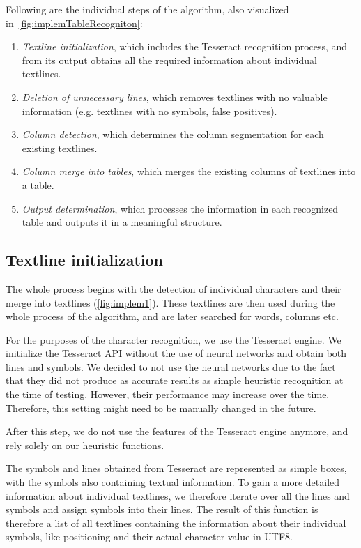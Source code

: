Following are the individual steps of the algorithm, also visualized in~\cref{fig:implemTableRecogniton}:
\begin{enumerate}
\item \emph{Textline initialization}, which includes the Tesseract recognition process, and from its output obtains all the required information about individual textlines.
\item \emph{Deletion of unnecessary lines}, which removes textlines with no valuable information (e.g. textlines with no symbols, false positives).
\item \emph{Column detection}, which determines the column segmentation for each existing textlines.
\item \emph{Column merge into tables}, which merges the existing columns of textlines into a table.
\item \emph{Output determination}, which processes the information in each recognized table and outputs it in a meaningful structure.
\end{enumerate}

\subsection{Textline initialization} \label{textlineInitialization}

The whole process begins with the detection of individual characters and their merge into textlines (\cref{fig:implem1}). These textlines are then used during the whole process of the algorithm, and are later searched for words, columns etc.

For the purposes of the character recognition, we use the Tesseract engine. We initialize the Tesseract API without the use of neural networks and obtain both lines and symbols. We decided to not use the neural networks due to the fact that they did not produce as accurate results as simple heuristic recognition at the time of testing. However, their performance may increase over the time. Therefore, this setting might need to be manually changed in the future.

After this step, we do not use the features of the Tesseract engine anymore, and rely solely on our heuristic functions.

The symbols and lines obtained from Tesseract are represented as simple boxes, with the symbols also containing textual information. To gain a more detailed information about individual textlines, we therefore iterate over all the lines and symbols and assign symbols into their lines. The result of this function is therefore a list of all textlines containing the information about their individual symbols, like positioning and their actual character value in UTF8.

